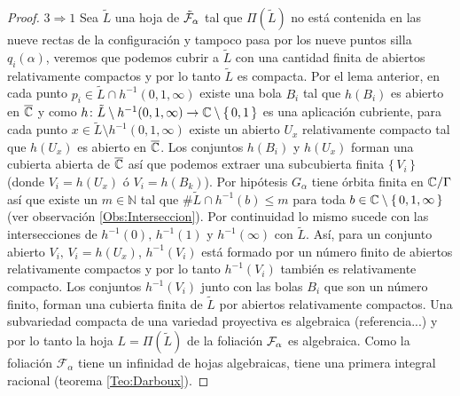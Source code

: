 \begin{proof}
\noindent $3\Rightarrow 1$ Sea $\tilde{L}$ una hoja de $\tilde{\mathcal{F}}_{\alpha}$ tal que $\Pi(\tilde{L})$ no está contenida en las nueve rectas de la configuración y tampoco pasa por los nueve puntos silla $q_{i}(\alpha)$, veremos que podemos cubrir a $\tilde{L}$ con una cantidad finita de abiertos relativamente compactos y por lo tanto $\tilde{L}$ es compacta. Por el lema anterior, en cada punto $p_{i}\in\tilde{L}\cap h^{-1}(0,1,\infty)$ existe una bola $B_{i}$ tal que $h(B_{i})$ es abierto en $\overline{\mathbb{C}}$ y como $h\colon\tilde{L}\setminus{h^{-1}(0,1,\infty)}\rightarrow\mathbb{C}\setminus\{\, 0,1\, \}$ es una aplicación cubriente, para cada punto $x\in\tilde{L}\setminus h^{-1}(0,1,\infty)$ existe un abierto $U_{x}$ relativamente compacto tal que $h(U_{x})$ es abierto en $\overline{\mathbb{C}}$. Los conjuntos $h(B_{i})$ y $h(U_{x})$ forman una cubierta abierta de $\overline{\mathbb{C}}$ así que podemos extraer una subcubierta finita $\{\, V_{i} \, \}$ (donde $V_{i}=h(U_{x})$ ó $V_{i}=h(B_{k})$). Por hipótesis $G_{\alpha}$ tiene órbita finita en $\mathbb{C}/\Gamma$ así que existe un $m\in\mathbb{N}$ tal que $\#\tilde{L}\cap h^{-1}(b)\leq m$ para toda $b\in \mathbb{C}\setminus\{\, 0,1,\infty\,\}$ (ver observación \ref{Obs:Interseccion}). Por continuidad lo mismo sucede con las intersecciones de $h^{-1}(0),\, h^{-1}(1)$ y $h^{-1}(\infty)$ con $\tilde{L}$. Así, para un conjunto abierto $V_{i},\, V_{i}=h(U_{x})$, $h^{-1}(V_{i})$ está formado por un número finito de abiertos relativamente compactos y por lo tanto $h^{-1}(V_{i})$ también es relativamente compacto. Los conjuntos $h^{-1}(V_{i})$ junto con las bolas $B_{i}$ que son un número finito, forman una cubierta finita de $\tilde{L}$ por abiertos relativamente compactos. Una subvariedad compacta de una variedad proyectiva es algebraica (referencia...) y por lo tanto la hoja $L=\Pi(\tilde{L})$ de la foliación $\mathcal{F}_{\alpha}$ es algebraica. Como la foliación $\mathcal{F}_{\alpha}$ tiene un infinidad de hojas algebraicas, tiene una primera integral racional (teorema \ref{Teo:Darboux}).
\end{proof}
